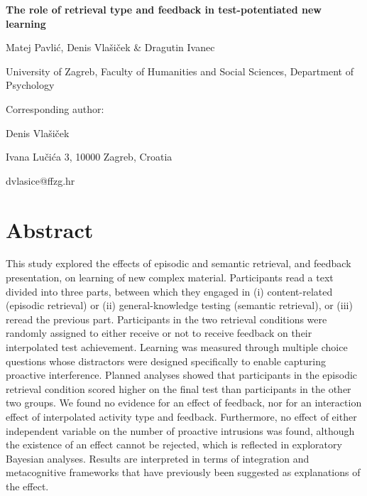\documentclass[12pt]{article}
\def\biblio{}
\begin{document}
\begin{titlepage}
    \begin{center}

        \vspace*{\fill}

        \Large
        \textbf{The role of retrieval type and feedback in test-potentiated new learning }
        \normalsize

        \bigskip
        Matej Pavlić, Denis Vlašiček \& Dragutin Ivanec

        University of Zagreb, Faculty of Humanities and Social Sciences,
        Department of Psychology

        \bigskip

        \raggedright
        Corresponding author:

        Denis Vlašiček

        Ivana Lučića 3, 10000 Zagreb, Croatia

        dvlasice@ffzg.hr

        \vspace*{\fill}

    \end{center}

\end{titlepage}

\def\biblio{}

\section{Abstract}

This study explored the effects of episodic and semantic retrieval, and
feedback presentation, on learning of new complex material. Participants
read a text divided into three parts, between which they engaged in
(i) content-related (episodic retrieval) or (ii) general-knowledge testing
(semantic retrieval), or (iii) reread the previous part. Participants in the 
two retrieval conditions were randomly assigned to either receive or not to receive
feedback on their interpolated test achievement. Learning was measured through 
multiple choice questions whose distractors were designed specifically to enable
capturing proactive interference. Planned analyses showed that participants in 
the episodic retrieval condition scored higher on the final test than participants 
in the other two groups. We found no evidence for an effect of feedback, nor 
for an interaction effect of interpolated activity type and feedback. Furthermore,
no effect of either independent variable on the number of proactive intrusions was 
found, although the existence of an effect cannot be rejected, which is reflected 
in exploratory Bayesian analyses. Results are interpreted in terms of integration 
and metacognitive frameworks that have previously been suggested as explanations
of the effect.
\end{document}
